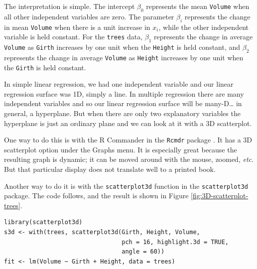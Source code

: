 \documentclass[captions=tableheading]{scrbook}
\begin{document}
The interpretation is simple. The intercept \(\beta_{0}\) represents the mean \texttt{Volume} when all other independent variables are zero. The parameter \(\beta_{i}\) represents the change in mean \texttt{Volume} when there is a unit increase in \(x_{i}\), while the other independent variable is held constant. For the \texttt{trees} data, \(\beta_{1}\) represents the change in average \texttt{Volume} as \texttt{Girth} increases by one unit when the \texttt{Height} is held constant, and \(\beta_{2}\) represents the change in average \texttt{Volume} as \texttt{Height} increases by one unit when the \texttt{Girth} is held constant. 


In simple linear regression, we had one independent variable and our linear regression surface was 1D, simply a line. In multiple regression there are many independent variables and so our linear regression surface will be many-D\ldots{} in general, a hyperplane. But when there are only two explanatory variables the hyperplane is just an ordinary plane and we can look at it with a 3D scatterplot. 

One way to do this is with the \textsf{R} Commander in the \texttt{Rcmdr} package \cite{Foxrcmdr}. It has a 3D scatterplot option under the \textsf{Graphs} menu. It is especially great because the resulting graph is dynamic; it can be moved around with the mouse, zoomed, \emph{etc}. But that particular display does not translate well to a printed book.

Another way to do it is with the \texttt{scatterplot3d} function in the \texttt{scatterplot3d} package. The code follows, and the result is shown in Figure \ref{fig:3D-scatterplot-trees}.


\begin{verbatim}
library(scatterplot3d)
s3d <- with(trees, scatterplot3d(Girth, Height, Volume, 
                                 pch = 16, highlight.3d = TRUE, 
                                 angle = 60))
fit <- lm(Volume ~ Girth + Height, data = trees)
\end{verbatim}
\end{document}
